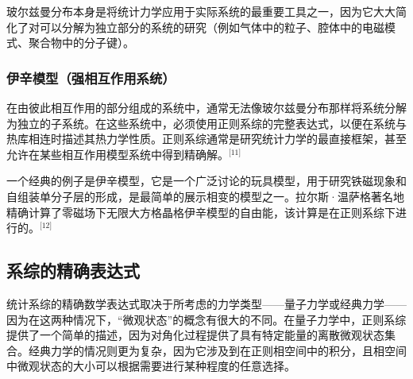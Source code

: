 玻尔兹曼分布本身是将统计力学应用于实际系统的最重要工具之一，因为它大大简化了对可以分解为独立部分的系统的研究（例如气体中的粒子、腔体中的电磁模式、聚合物中的分子键）。
\subsubsection{伊辛模型（强相互作用系统）}  
在由彼此相互作用的部分组成的系统中，通常无法像玻尔兹曼分布那样将系统分解为独立的子系统。在这些系统中，必须使用正则系综的完整表达式，以便在系统与热库相连时描述其热力学性质。正则系综通常是研究统计力学的最直接框架，甚至允许在某些相互作用模型系统中得到精确解。\(^\text{[11]}\)

一个经典的例子是伊辛模型，它是一个广泛讨论的玩具模型，用于研究铁磁现象和自组装单分子层的形成，是最简单的展示相变的模型之一。拉尔斯·温萨格著名地精确计算了零磁场下无限大方格晶格伊辛模型的自由能，该计算是在正则系综下进行的。\(^\text{[12]}\)
\subsection{系综的精确表达式}
统计系综的精确数学表达式取决于所考虑的力学类型——量子力学或经典力学——因为在这两种情况下，“微观状态”的概念有很大的不同。在量子力学中，正则系综提供了一个简单的描述，因为对角化过程提供了具有特定能量的离散微观状态集合。经典力学的情况则更为复杂，因为它涉及到在正则相空间中的积分，且相空间中微观状态的大小可以根据需要进行某种程度的任意选择。
